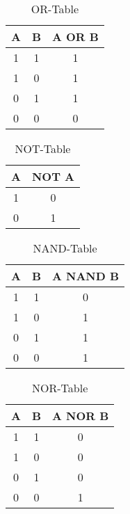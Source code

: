 \documentclass{article}
\begin{document}
\begin{table}
	\begin{center}
		\label{tab:or}
		\caption{OR-Table}
		\begin{tabular}{|c|c|c|}
			A & B & A OR B\\
			\hline
			1&1&1\\
			1&0&1\\
			0&1&1\\
			0&0&0\\
		\end{tabular}
	\end{center}
\end{table}

\begin{table}
	\begin{center}
		\label{tab:not}
		\caption{NOT-Table}
		\begin{tabular}{|c|c|}
			A & NOT A\\
			\hline
			1&0\\
			0&1\\
		\end{tabular}
	\end{center}
\end{table}

\begin{table}
	\begin{center}
		\label{tab:table4}
		\caption{NAND-Table}
		\begin{tabular}{|c|c|c|}
			A& B & A NAND B\\
			\hline
			1&1&0\\
			1&0&1\\
			0&1&1\\
			0&0&1\\
		\end{tabular}
	\end{center}
\end{table}

\begin{table}
	\begin{center}
		\label{tab:table5}
		\caption{NOR-Table}
		\begin{tabular}{|c|c|c|}
			A & B & A NOR B\\
			\hline
			1&1&0\\
			1&0&0\\
			0&1&0\\
			0&0&1\\
		\end{tabular}
	\end{center}
\end{table}
\end{document}
